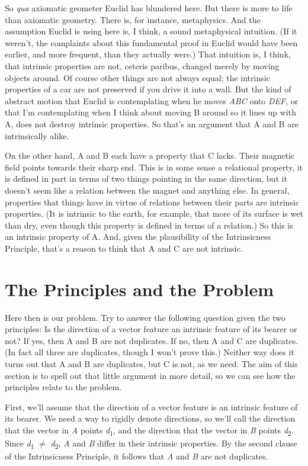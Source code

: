 So \textit{qua} axiomatic geometer Euclid has blundered here. But there is more to life than axiomatic geometry. There is, for instance, metaphysics. And the assumption Euclid is using here is, I think, a sound metaphysical intuition. (If it weren't, the complaints about this fundamental proof in Euclid would have been earlier, and more frequent, than they actually were.) That intuition is, I think, that intrinsic properties are not, ceteris paribus, changed merely by moving objects around. Of course other things are not always equal; the intrinsic properties of a car are not preserved if you drive it into a wall. But the kind of abstract motion that Euclid is contemplating when he moves \textit{ABC} onto \textit{DEF}, or that I'm contemplating when I think about moving B around so it lines up with A, does not destroy intrinsic properties. So that's an argument that A and B are intrinsically alike.

On the other hand, A and B each have a property that C lacks. Their magnetic field points towards their sharp end. This is in some sense a relational property, it is defined in part in terms of two things pointing in the same direction, but it doesn't seem like a relation between the magnet and anything else. In general, properties that things have in virtue of relations between their parts are intrinsic properties. (It is intrinsic to the earth, for example, that more of its surface is wet than dry, even though this property is defined in terms of a relation.) So this is an intrinsic property of A. And, given the plausibility of the Intrinsicness Principle, that's a reason to think that A and C are not intrinsic. 

\section{The Principles and the Problem}

Here then is our problem. Try to answer the following question given the two principles: Is the direction of a vector feature an intrinsic feature of its bearer or not? If yes, then A and B are not duplicates. If no, then A and C are duplicates. (In fact all three are duplicates, though I won't prove this.) Neither way does it turns out that A and B are duplicates, but C is not, as we need. The aim of this section is to spell out that little argument in more detail, so we can see how the principles relate to the problem.

First, we'll assume that the direction of a vector feature is an intrinsic feature of its bearer. We need a way to rigidly denote directions, so we'll call the direction that the vector in \textit{A} points \textit{d}\textsubscript{1}, and the direction that the vector in \textit{B} points \textit{d}\textsubscript{2}. Since \textit{d}\textsubscript{1} ${\neq}$ \textit{d}\textsubscript{2}, \textit{A} and \textit{B} differ in their intrinsic properties. By the second clause of the Intrinsicness Principle, it follows that \textit{A} and \textit{B} are not duplicates.

